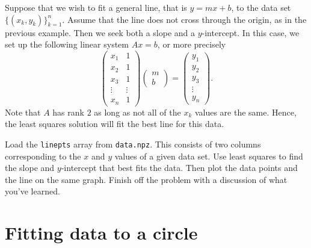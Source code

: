 Suppose that we wish to fit a general line, that is $y=m x+b$, to the data set $\{(x_k,y_k)\}^n_{k=1}$.  Assume that the line does not cross through the origin, as in the previous example.  Then we seek both a slope and a $y$-intercept.  In this case, we set up the following linear system $A x = b$, or more precisely
\[
\begin{pmatrix}
x_1 & 1\\
x_2 & 1\\
x_3 & 1\\
\vdots & \vdots\\
x_n & 1
\end{pmatrix}
\begin{pmatrix}
m\\
b
\end{pmatrix}=
\begin{pmatrix}
y_1\\
y_2\\
y_3\\
\vdots\\
y_n
\end{pmatrix}.
\]
Note that $A$ has rank $2$ as long as not all of the $x_k$ values are the same.  Hence, the least squares solution will fit the best line for this data.


\begin{problem}
Load the \texttt{linepts} array from \texttt{data.npz}.
This consists of two columns corresponding to the $x$ and $y$ values of a given data set.  Use least squares to find the slope and $y$-intercept that best fits the data.  Then plot the data points and the line on the same graph.  Finish off the problem with a discussion of what you've learned.
\end{problem}

\section*{Fitting data to a circle}

